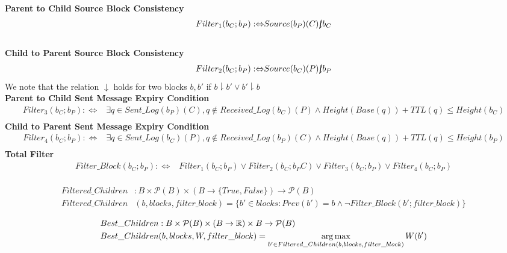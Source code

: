 \begin{defn}
  \textbf{\\Parent to Child Source Block Consistency}
  \begin{align*}
    Filter_1(b_C; b_P): \Leftrightarrow& Source(b_P)(C) \cancel{\downharpoonright} b_C \\
  \end{align*}
  \textbf{\\Child to Parent Source Block Consistency}
  \begin{align*}
    Filter_2(b_C; b_P): \Leftrightarrow& Source(b_C)(P) \cancel{\downharpoonright} b_P \\
  \end{align*}
  We note that the relation $\downarrow$ holds for two blocks $b, b'$ if $b \downharpoonright b' \lor b' \downharpoonright b$
  \textbf{\\Parent to Child Sent Message Expiry Condition}
  \begin{align*}
    Filter_3(b_C; b_P): \Leftrightarrow& \exists q \in Sent\_Log(b_P)(C), q \notin Received\_Log(b_C)(P) \land Height(Base(q)) + TTL(q) \leq Height(b_C) \\
  \end{align*}
  \textbf{Child to Parent Sent Message Expiry Condition}
  \begin{align*}
    Filter_4(b_C; b_P): \Leftrightarrow& \exists q \in Sent\_Log(b_C)(P), q \notin Received\_Log(b_P)(C) \land Height(Base(q)) + TTL(q) \leq Height(b_P) \\
  \end{align*}
  \textbf{Total Filter}
  \begin{align*}
    Filter\_Block(b_C; b_P): \Leftrightarrow& Filter_1(b_C; b_P) \lor Filter_2(b_C; b_PC) \lor Filter_3(b_C; b_P) \lor Filter_4(b_C; b_P) \\
  \end{align*}
\end{defn}


\begin{defn}
\begin{align*}
  Filtered\_Children&: B \times \mathcal{P}(B) \times ( B \to \{True, False\} ) \to \mathcal{P}(B) \\
  Filtered\_Children&(b, blocks, filter\_block) = \{ b' \in blocks: Prev(b') = b \land \neg Filter\_Block(b'; filter\_block) \}
\end{align*}
\end{defn}

\begin{defn}
\begin{align*}
  Best\_Children&: B \times \mathcal{P}(B) \times (B \to \mathbb{R}) \times B \to \mathcal{P}(B) \\
  Best\_Children&(b, blocks, W, filter\_block) =  \operatorname*{arg\,max}\limits_{b' \in Filtered\_Children(b, blocks, filter\_block)} W(b')
\end{align*}
\end{defn}

